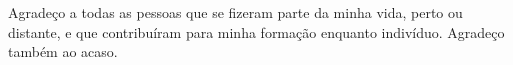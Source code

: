 Agradeço a todas as pessoas que se fizeram parte da minha vida, perto ou distante, e que contribuíram para minha formação enquanto indivíduo. Agradeço também ao acaso.
